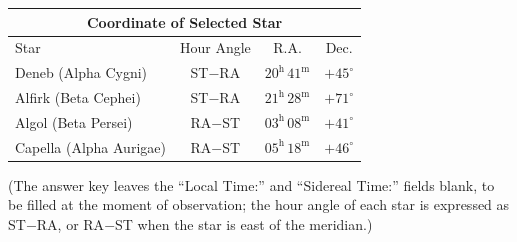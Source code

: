 \begin{center}
\begin{tabular}{|l|c|c|c|}
\hline
\multicolumn{4}{|c|}{Coordinate of Selected Star} \\
\hline
Star & Hour Angle & R.A. & Dec. \\
\hline
Deneb (Alpha Cygni) & ST$-$RA & $20^{\mathrm{h}}\,41^{\mathrm{m}}$ & $+45^\circ$ \\
\hline
Alfirk (Beta Cephei) & ST$-$RA & $21^{\mathrm{h}}\,28^{\mathrm{m}}$ & $+71^\circ$ \\
\hline
Algol (Beta Persei) & RA$-$ST & $03^{\mathrm{h}}\,08^{\mathrm{m}}$ & $+41^\circ$ \\
\hline
Capella (Alpha Aurigae) & RA$-$ST & $05^{\mathrm{h}}\,18^{\mathrm{m}}$ & $+46^\circ$ \\
\hline
\end{tabular}
\end{center}

(The answer key leaves the ``Local Time:'' and ``Sidereal Time:'' fields
blank, to be filled at the moment of observation; the hour angle of each
star is expressed as ST$-$RA, or RA$-$ST when the star is east of the
meridian.)
